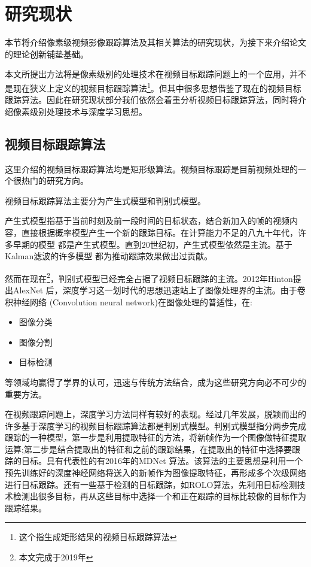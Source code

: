 
\newpage
\section{研究现状}
本节将介绍像素级视频影像跟踪算法及其相关算法的研究现状，为接下来介绍论文的理论创新铺垫基础。
\par
本文所提出方法将是像素级别的处理技术在视频目标跟踪问题上的一个应用，并不是现在狭义上定义的视频目标跟踪算法\footnote{这个指生成矩形结果的视频目标跟踪算法}。但其中很多思想借鉴了现在的视频目标跟踪算法。因此在研究现状部分我们依然会着重分析视频目标跟踪算法，同时将介绍像素级别处理技术与深度学习思想。

\subsection{视频目标跟踪算法}
这里介绍的视频目标跟踪算法均是矩形级算法。视频目标跟踪是目前视频处理的一个很热门的研究方向。
\par
视频目标跟踪算法主要分为产生式模型和判别式模型。
\par
产生式模型指基于当前时刻及前一段时间的目标状态，结合新加入的帧的视频内容，直接根据概率模型产生一个新的跟踪目标。在计算能力不足的八九十年代，许多早期的模型
\supercite{schalkoff1982model}
都是产生式模型。直到20世纪初，产生式模型依然是主流。基于Kalman滤波的许多模型
\supercite{kim2002fast, weng2006video, comaniciu2003kernel}
都为推动跟踪效果做出过贡献。
\par
然而在现在\footnote{本文完成于2019年}，判别式模型已经完全占据了视频目标跟踪的主流。2012年Hinton提出AlexNet 
\supercite{krizhevsky2012imagenet} 
后，深度学习这一划时代的思想迅速站上了图像处理界的主流。由于卷积神经网络
\supercite{krizhevsky2012imagenet} 
(Convolution neural network)在图像处理的普适性，在:
\begin{itemize}
    \item 图像分类\supercite{krizhevsky2012imagenet, witten2016data, he2016deep}
    \item 图像分割\supercite{long2015fully}
    \item 目标检测\supercite{ren2015faster, redmon2016you}
\end{itemize}
等领域均赢得了学界的认可，迅速与传统方法结合，成为这些研究方向必不可少的重要方法。
\par
在视频跟踪问题上，深度学习方法同样有较好的表现。经过几年发展，脱颖而出的许多基于深度学习的视频目标跟踪算法都是判别式模型。判别式模型指分两步完成跟踪的一种模型，第一步是利用提取特征的方法，将新帧作为一个图像做特征提取运算;第二步是结合提取出的特征和之前的跟踪结果，在提取出的特征中选择要跟踪的目标。具有代表性的有2016年的MDNet \supercite{nam2016mdnet}算法。该算法的主要思想是利用一个预先训练好的深度神经网络将送入的新帧作为图像提取特征，再形成多个次级网络进行目标跟踪。还有一些基于检测的目标跟踪，如ROLO\supercite{ning2016spatially}算法，先利用目标检测技术检测出很多目标，再从这些目标中选择一个和正在跟踪的目标比较像的目标作为跟踪结果。
